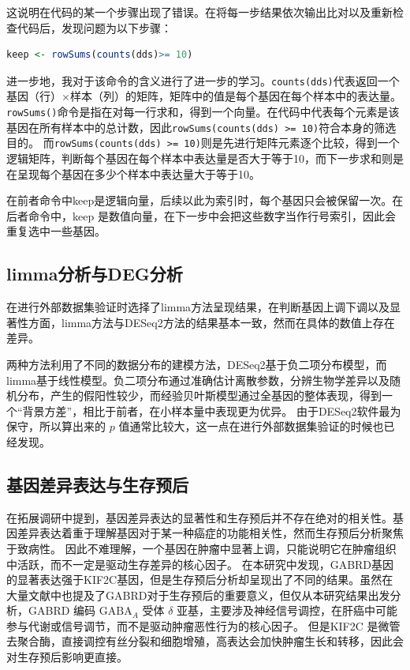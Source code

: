 \documentclass{article}
\begin{document}
这说明在代码的某一个步骤出现了错误。在将每一步结果依次输出比对以及重新检查代码后，发现问题为以下步骤：

\begin{lstlisting}[language=R]
keep <- rowSums(counts(dds)>= 10) 
\end{lstlisting}

进一步地，我对于该命令的含义进行了进一步的学习。\texttt{counts(dds)}代表返回一个基因（行）$×$样本（列）的矩阵，矩阵中的值是每个基因在每个样本中的表达量。\texttt{rowSums()}命令是指在对每一行求和，得到一个向量。在代码中代表每个元素是该基因在所有样本中的总计数，因此\texttt{rowSums(counts(dds) >= 10)}符合本身的筛选目的。
而\texttt{rowSums(counts(dds) >= 10)}则是先进行矩阵元素逐个比较，得到一个逻辑矩阵，判断每个基因在每个样本中表达量是否大于等于10，而下一步求和则是在呈现每个基因在多少个样本中表达量大于等于10。

在前者命令中keep是逻辑向量，后续以此为索引时，每个基因只会被保留一次。在后者命令中，keep 是数值向量，在下一步中会把这些数字当作行号索引，因此会重复选中一些基因。

\subsection{limma分析与DEG分析}

在进行外部数据集验证时选择了limma方法呈现结果，在判断基因上调下调以及显著性方面，limma方法与DESeq2方法的结果基本一致，然而在具体的数值上存在差异。

两种方法利用了不同的数据分布的建模方法，DESeq2基于负二项分布模型，而limma基于线性模型。负二项分布通过准确估计离散参数，分辨生物学差异以及随机分布，产生的假阳性较少，而经验贝叶斯模型通过全基因的整体表现，得到一个“背景方差”，相比于前者，在小样本量中表现更为优异。
由于DESeq2软件最为保守，所以算出来的 $p$ 值通常比较大，这一点在进行外部数据集验证的时候也已经发现。

\subsection{基因差异表达与生存预后}

在拓展调研中提到，基因差异表达的显著性和生存预后并不存在绝对的相关性。基因差异表达着重于理解基因对于某一种癌症的功能相关性，然而生存预后分析聚焦于致病性。
因此不难理解，一个基因在肿瘤中显著上调，只能说明它在肿瘤组织中活跃，而不一定是驱动生存差异的核心因子。
在本研究中发现，GABRD基因的显著表达强于KIF2C基因，但是生存预后分析却呈现出了不同的结果。虽然在大量文献中也提及了GABRD对于生存预后的重要意义，但仅从本研究结果出发分析，GABRD 编码 $\mathrm{GABA}_{A}$ 受体 $\delta$ 亚基，主要涉及神经信号调控，在肝癌中可能参与代谢或信号调节，而不是驱动肿瘤恶性行为的核心因子。
但是KIF2C 是微管去聚合酶，直接调控有丝分裂和细胞增殖，高表达会加快肿瘤生长和转移，因此会对生存预后影响更直接。
\end{document}
